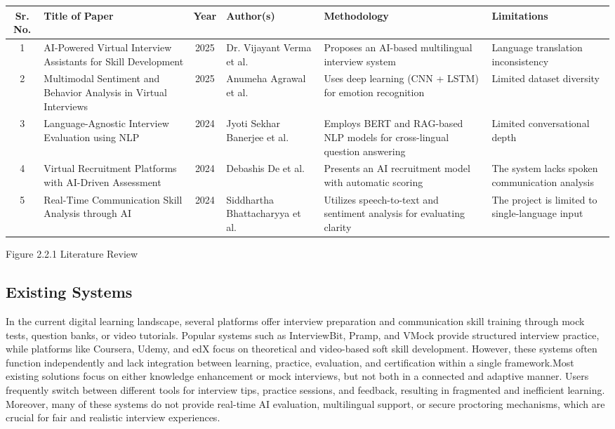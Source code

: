 \documentclass[12pt]{article}
\begin{document}
\begin{longtable}{|c|p{4cm}|c|p{2.5cm}|p{2.5cm}|p{2.5cm}|}
\hline
\textbf{Sr. No.} & \textbf{Title of Paper} & \textbf{Year} & \textbf{Author(s)} & \textbf{Methodology} & \textbf{Limitations} \\
\hline
1 & AI-Powered Virtual Interview Assistants for Skill Development & 2025 & Dr. Vijayant Verma et al. & Proposes an AI-based multilingual interview system & Language translation inconsistency \\
\hline
2 & Multimodal Sentiment and Behavior Analysis in Virtual Interviews & 2025 & Anumeha Agrawal et al. & Uses deep learning (CNN + LSTM) for emotion recognition & Limited dataset diversity\\
\hline
3 & Language-Agnostic Interview Evaluation using NLP  & 2024 & Jyoti Sekhar Banerjee et al. & Employs BERT and RAG-based NLP models for cross-lingual question answering  & Limited conversational depth \\
\hline
4 & Virtual Recruitment Platforms with AI-Driven Assessment  & 2024 & Debashis De et al. & Presents an AI recruitment model with automatic scoring & The system lacks spoken communication analysis \\
\hline
5 & Real-Time Communication Skill Analysis through AI  & 2024 & Siddhartha Bhattacharyya et al. & Utilizes speech-to-text and sentiment analysis for evaluating clarity & The project is limited to single-language input \\
\hline
\end{longtable}

\begin{center}
Figure 2.2.1 Literature Review
\end{center}

\newpage

\subsection{Existing Systems}
\vspace{10pt}

In the current digital learning landscape, several platforms offer interview preparation and communication skill training through mock tests, question banks, or video tutorials. Popular systems such as InterviewBit, Pramp, and VMock provide structured interview practice, while platforms like Coursera, Udemy, and edX focus on theoretical and video-based soft skill development. However, these systems often function independently and lack integration between learning, practice, evaluation, and certification within a single framework.Most existing solutions focus on either knowledge enhancement or mock interviews, but not both in a connected and adaptive manner. Users frequently switch between different tools for interview tips, practice sessions, and feedback, resulting in fragmented and inefficient learning. Moreover, many of these systems do not provide real-time AI evaluation, multilingual support, or secure proctoring mechanisms, which are crucial for fair and realistic interview experiences.
\\
\end{document}
